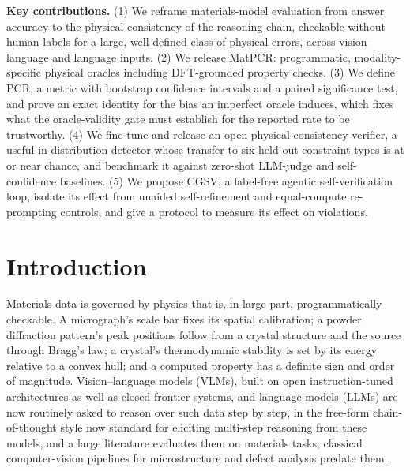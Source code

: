\documentclass[pdflatex,sn-nature]{sn-jnl}
\begin{document}

\maketitle

\noindent\begin{tcolorbox}[colback=gray!6,colframe=gray!50,boxrule=0.5pt]
\textbf{Key contributions.} (1) We reframe materials-model evaluation from answer accuracy to the physical
consistency of the reasoning chain, checkable without human labels for a large,
well-defined class of physical errors, across vision--language and language inputs. (2) We release MatPCR: programmatic,
modality-specific physical oracles including DFT-grounded property checks. (3) We
define PCR, a metric with bootstrap confidence intervals and a paired significance
test, and prove an exact identity for the bias an imperfect oracle induces, which fixes
what the oracle-validity gate must establish for the reported rate to be trustworthy.
(4) We fine-tune and release an open physical-consistency verifier, a useful
in-distribution detector whose transfer to six held-out constraint types is at or near
chance,
and benchmark it against zero-shot LLM-judge and self-confidence baselines. (5) We
propose CGSV, a label-free agentic self-verification loop, isolate its effect from
unaided self-refinement and equal-compute re-prompting controls, and give a protocol to measure
its effect on violations.
\end{tcolorbox}

\section*{Introduction}
Materials data is governed by physics that is, in large part, programmatically
checkable. A micrograph's scale bar fixes its spatial calibration; a powder
diffraction pattern's peak positions follow from a crystal structure and the source
through Bragg's law; a crystal's thermodynamic stability is set by its energy
relative to a convex hull; and a computed property has a definite sign and order of
magnitude. Vision--language models (VLMs), built on open instruction-tuned
architectures\cite{liu2024llava} as well as closed frontier systems, and language
models (LLMs) are now
routinely asked to reason over such data step by step, in the free-form
chain-of-thought style now standard for eliciting multi-step reasoning from these
models,\cite{wei2022cot} and a large literature evaluates them on
materials tasks;\cite{lai2025materials,npj2026vlmeval,choudhary2025microscopygpt,li2024mmsci}
classical computer-vision pipelines for microstructure and defect analysis predate
them.\cite{holm2020cv,li2018defect}
\end{document}
